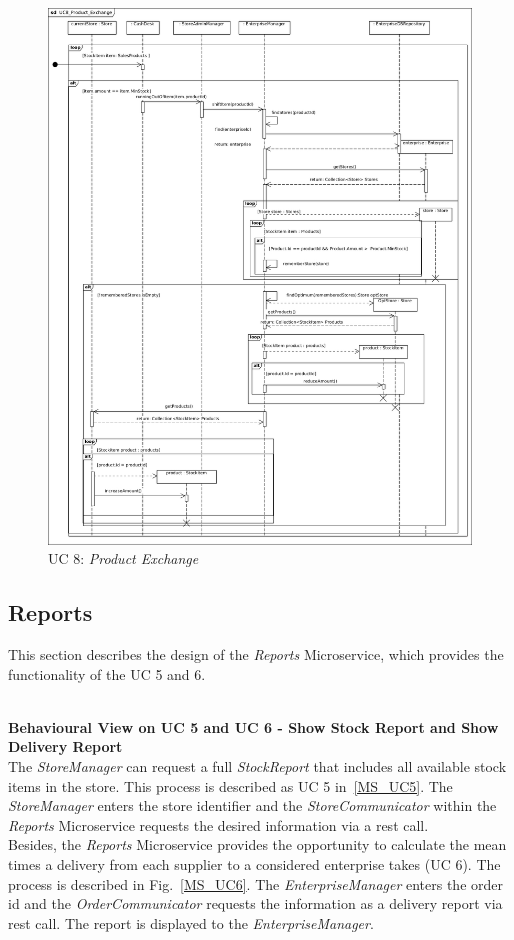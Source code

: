 			\begin{figure}[!h]
				\centering
				\includegraphics[width = .9\textwidth]{img/UC8_Product_Exchange.jpg}
				\caption{UC 8: \textit{Product Exchange}}
				\label{MS_UC8}
			\end{figure}
		\FloatBarrier	
		
		\subsection{Reports}
		This section describes the design of the \textit{Reports} Microservice, which provides the functionality of the UC 5 and 6.
		
		 \noindent
		 \\
		\textbf{Behavioural View on UC 5 and UC 6 - Show Stock Report and Show Delivery Report} \\
		The \textit{StoreManager} can request a full \textit{StockReport} that includes all available stock items in the store. This process is described as UC 5 in~\ref{MS_UC5}. The \textit{StoreManager} enters the store identifier and the \textit{StoreCommunicator} within the \textit{Reports} Microservice requests the desired information via a rest call.
		\\
		Besides, the \textit{Reports} Microservice provides the opportunity to calculate the mean times a delivery from each supplier to a considered enterprise takes (UC 6). The process is described in  Fig.~\ref{MS_UC6}. The \textit{EnterpriseManager} enters the order id and the \textit{OrderCommunicator} requests the information as a delivery report via rest call. The report is displayed to the \textit{EnterpriseManager}.
		
